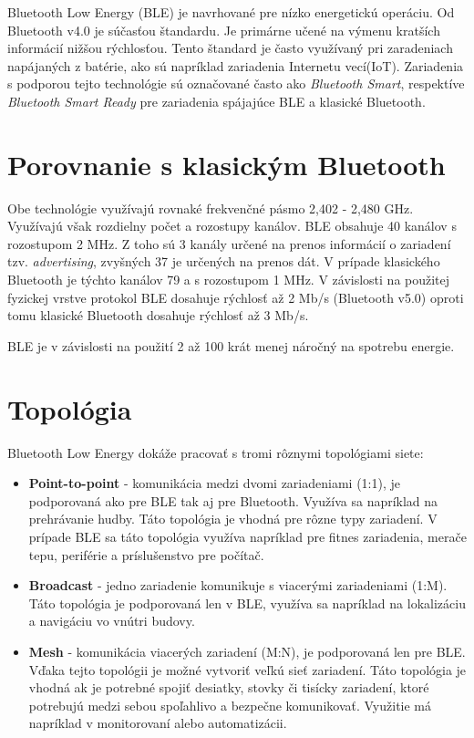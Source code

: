 Bluetooth Low Energy (BLE) je navrhované pre nízko energetickú operáciu. Od Bluetooth v4.0 je súčasťou štandardu. Je primárne učené na výmenu kratších informácií nižšou rýchlosťou. Tento štandard je často využívaný pri zaradeniach napájaných z batérie, ako sú napríklad zariadenia Internetu vecí(IoT). Zariadenia s podporou tejto technológie sú označované často ako \textit{Bluetooth Smart}, respektíve \textit{Bluetooth Smart Ready} pre zariadenia spájajúce BLE a klasické Bluetooth.

\section{Porovnanie s klasickým Bluetooth}

Obe technológie využívajú rovnaké frekvenčné pásmo 2,402 - 2,480 GHz. Využívajú však rozdielny počet a rozostupy kanálov. BLE obsahuje 40 kanálov s rozostupom 2 MHz. Z toho sú 3 kanály určené na prenos informácií o zariadení tzv. \textit{advertising}, zvyšných 37 je určených na prenos dát. V prípade klasického Bluetooth je týchto kanálov 79 a s rozostupom 1 MHz. V závislosti na použitej fyzickej vrstve protokol BLE dosahuje rýchlosť až 2 Mb/s (Bluetooth v5.0) oproti tomu klasické Bluetooth dosahuje rýchlosť až 3 Mb/s.

BLE je v závislosti na použití 2 až 100 krát menej náročný na spotrebu energie.
\cite{bluetooth}

\section{Topológia}
Bluetooth Low Energy dokáže pracovať s tromi rôznymi topológiami siete:
\begin{itemize}
    \item \textbf{Point-to-point} - komunikácia medzi dvomi zariadeniami (1:1), je podporovaná ako pre BLE tak aj pre Bluetooth. Využíva sa napríklad na prehrávanie hudby. Táto topológia je vhodná pre rôzne typy zariadení. V prípade BLE sa táto topológia využíva napríklad pre fitnes zariadenia, merače tepu, periférie a príslušenstvo pre počítač.
    \item \textbf{Broadcast} - jedno zariadenie komunikuje s viacerými zariadeniami (1:M). Táto topológia je podporovaná len v BLE, využíva sa napríklad na lokalizáciu a navigáciu vo vnútri budovy.  
    \item \textbf{Mesh} - komunikácia viacerých zariadení (M:N), je podporovaná len pre BLE. Vďaka tejto topológii je možné vytvoriť veľkú sieť zariadení. Táto topológia je vhodná ak je potrebné spojiť desiatky, stovky či tisícky zariadení, ktoré potrebujú medzi sebou spoľahlivo a bezpečne komunikovať. Využitie má napríklad v monitorovaní alebo automatizácii.\cite{bluetooth}
\end{itemize}

